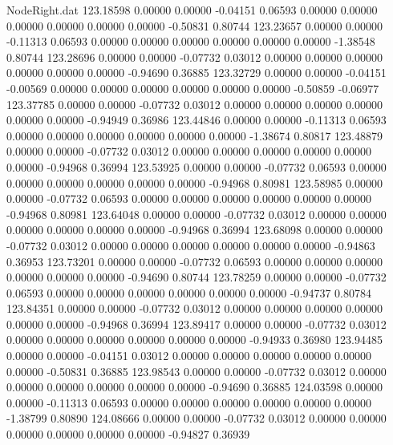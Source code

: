 \begin{filecontents}{NodeRight.dat}
 123.18598    0.00000    0.00000    -0.04151    0.06593    0.00000    0.00000    0.00000    0.00000    0.00000    0.00000   -0.50831    0.80744
 123.23657    0.00000    0.00000    -0.11313    0.06593    0.00000    0.00000    0.00000    0.00000    0.00000    0.00000   -1.38548    0.80744
 123.28696    0.00000    0.00000    -0.07732    0.03012    0.00000    0.00000    0.00000    0.00000    0.00000    0.00000   -0.94690    0.36885
 123.32729    0.00000    0.00000    -0.04151   -0.00569    0.00000    0.00000    0.00000    0.00000    0.00000    0.00000   -0.50859   -0.06977
 123.37785    0.00000    0.00000    -0.07732    0.03012    0.00000    0.00000    0.00000    0.00000    0.00000    0.00000   -0.94949    0.36986
 123.44846    0.00000    0.00000    -0.11313    0.06593    0.00000    0.00000    0.00000    0.00000    0.00000    0.00000   -1.38674    0.80817
 123.48879    0.00000    0.00000    -0.07732    0.03012    0.00000    0.00000    0.00000    0.00000    0.00000    0.00000   -0.94968    0.36994
 123.53925    0.00000    0.00000    -0.07732    0.06593    0.00000    0.00000    0.00000    0.00000    0.00000    0.00000   -0.94968    0.80981
 123.58985    0.00000    0.00000    -0.07732    0.06593    0.00000    0.00000    0.00000    0.00000    0.00000    0.00000   -0.94968    0.80981
 123.64048    0.00000    0.00000    -0.07732    0.03012    0.00000    0.00000    0.00000    0.00000    0.00000    0.00000   -0.94968    0.36994
 123.68098    0.00000    0.00000    -0.07732    0.03012    0.00000    0.00000    0.00000    0.00000    0.00000    0.00000   -0.94863    0.36953
 123.73201    0.00000    0.00000    -0.07732    0.06593    0.00000    0.00000    0.00000    0.00000    0.00000    0.00000   -0.94690    0.80744
 123.78259    0.00000    0.00000    -0.07732    0.06593    0.00000    0.00000    0.00000    0.00000    0.00000    0.00000   -0.94737    0.80784
 123.84351    0.00000    0.00000    -0.07732    0.03012    0.00000    0.00000    0.00000    0.00000    0.00000    0.00000   -0.94968    0.36994
 123.89417    0.00000    0.00000    -0.07732    0.03012    0.00000    0.00000    0.00000    0.00000    0.00000    0.00000   -0.94933    0.36980
 123.94485    0.00000    0.00000    -0.04151    0.03012    0.00000    0.00000    0.00000    0.00000    0.00000    0.00000   -0.50831    0.36885
 123.98543    0.00000    0.00000    -0.07732    0.03012    0.00000    0.00000    0.00000    0.00000    0.00000    0.00000   -0.94690    0.36885
 124.03598    0.00000    0.00000    -0.11313    0.06593    0.00000    0.00000    0.00000    0.00000    0.00000    0.00000   -1.38799    0.80890
 124.08666    0.00000    0.00000    -0.07732    0.03012    0.00000    0.00000    0.00000    0.00000    0.00000    0.00000   -0.94827    0.36939

\end{filecontents}
